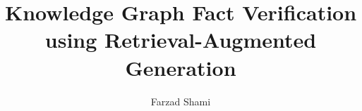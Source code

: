 \documentclass{DEIThesis}
\title{Knowledge Graph Fact Verification using Retrieval-Augmented Generation}
\author{Farzad Shami}
\begin{document}
    \makeatletter
    \DeclareRobustCommand\onedot{\futurelet\@let@token\@onedot}
    \def\@onedot{\ifx\@let@token.\else.\null\fi\xspace}

    \def\eg{\emph{e.g}\onedot} \def\Eg{\emph{E.g}\onedot}
    \def\ie{\emph{i.e}\onedot} \def\Ie{\emph{I.e}\onedot}
    \def\cf{\emph{c.f}\onedot} \def\Cf{\emph{C.f}\onedot}
    \def\etc{\emph{etc}\onedot} \def\vs{\emph{vs}\onedot}
    \def\wrt{w.r.t\onedot} \def\dof{d.o.f\onedot}
    \def\etal{\emph{et al}\onedot}
    \makeatother
    \frontmatter

    \mainmatter
    
    
    
    
    
    
    
    
    
    \backmatter
\end{document}

